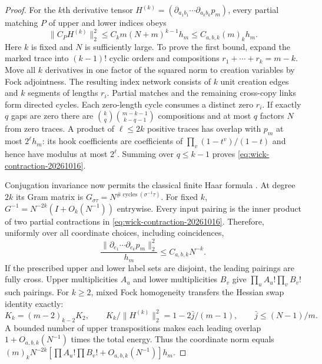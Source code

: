 \begin{proof}
For the $k$th derivative tensor
$H^{(k)}=(\partial_{a_1b_1}\cdots\partial_{a_kb_k}p_m)$, every partial matching
$P$ of upper and lower indices obeys
\begin{equation}
 \|C_PH^{(k)}\|_2^2\le C_km(N+m)^{k-1}h_m
          \le C_{a,b,k}(m)_kh_m.
 \label{eq:wick-contraction-20261016}
\end{equation}
Here $k$ is fixed and $N$ is sufficiently large. To prove the first bound,
expand the marked trace into $(k-1)!$ cyclic orders and compositions
$r_1+\cdots+r_k=m-k$. Move all $k$ derivatives in one factor of the
squared norm to creation variables by Fock adjointness. The resulting
index network consists of $k$ unit creation edges and $k$ segments of
lengths $r_i$. Partial matches and the remaining cross-copy links form
directed cycles. Each zero-length cycle consumes a distinct zero $r_i$.
If exactly $q$ gaps are zero there are
$\binom{k}{q}\binom{m-k-1}{k-q-1}$ compositions and at most $q$ factors
$N$ from zero traces. A product of $\ell\le2k$ positive traces has overlap
with $p_m$ at most $2^\ell h_m$: its hook coefficients are coefficients of
$\prod_v(1-t^v)/(1-t)$ and hence have modulus at most $2^\ell$.
Summing over $q\le k-1$ proves \eqref{eq:wick-contraction-20261016}.

Conjugation invariance now permits the classical finite Haar formula
\cite{CollinsSniady2006}. At degree $2k$ its Gram matrix is
$G_{\sigma\tau}=N^{\#\operatorname{cycles}(\sigma^{-1}\tau)}$.
For fixed $k$, $G^{-1}=N^{-2k}(I+O_k(N^{-1}))$ entrywise.
Every input pairing is the inner product of two partial contractions
in \eqref{eq:wick-contraction-20261016}. Therefore, uniformly over all
coordinate choices, including coincidences,
\[
 \frac{\|\partial_{e_1}\cdots\partial_{e_k}p_m\|_2^2}{h_m}
       \le C_{a,b,k}N^{-k}.
\]
If the prescribed upper and lower label sets are disjoint, the leading
pairings are fully cross. Upper multiplicities $A_u$ and lower
multiplicities $B_v$ give $\prod_u A_u!\prod_v B_v!$ such pairings.
For $k\ge2$, mixed Fock homogeneity transfers the Hessian swap identity exactly:
\[
 K_k=(m-2)_{k-2}K_2,\qquad
 K_k/\|H^{(k)}\|_2^2=1-2\bar j/(m-1),\qquad
 \bar j\le(N-1)/m.
\]
A bounded number of upper transpositions makes each leading overlap
$1+O_{a,b,k}(N^{-1})$ times the total energy. Thus the coordinate norm
equals $(m)_kN^{-2k}[\prod A_u!\prod B_v!+O_{a,b,k}(N^{-1})]h_m$.


\end{proof}
